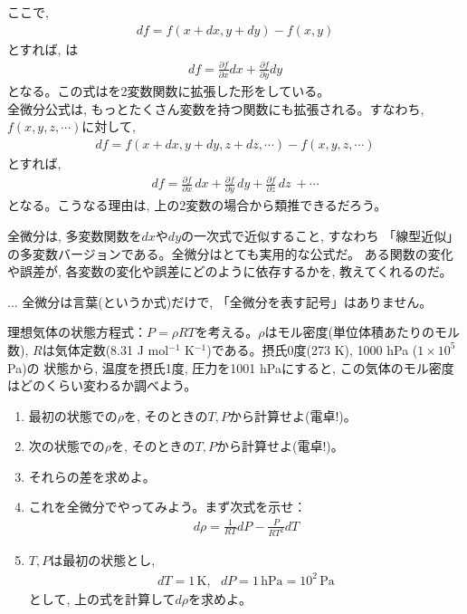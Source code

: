 ここで, 
\begin{eqnarray}df=f(x+dx,y+dy) - f(x, y)\end{eqnarray}
とすれば, は
\begin{eqnarray}
df= \frac{\partial f}{\partial x}dx+\frac{\partial f}{\partial y}dy
\end{eqnarray}
となる。この式はを2変数関数に拡張した形をしている。\\

全微分公式は, もっとたくさん変数を持つ関数にも拡張される。すなわち, $f(x, y, z, \cdots)$に対して, 
\begin{eqnarray*}df=f(x+dx, y+dy, z+dz, \cdots) - f(x, y, z, \cdots)\end{eqnarray*}
とすれば, 
\begin{eqnarray}
df = \frac{\partial f}{\partial x}\,dx + \frac{\partial f}{\partial y}\,dy + \frac{\partial f}{\partial z}\,dz\ + \cdots
\end{eqnarray}
となる。こうなる理由は, 上の2変数の場合から類推できるだろう。

全微分は, 多変数関数を$dx$や$dy$の一次式で近似すること, すなわち
「線型近似」の多変数バージョンである。全微分はとても実用的な公式だ。
ある関数の変化や誤差が, 各変数の変化や誤差にどのように依存するかを, 教えてくれるのだ。\\

\begin{faq}{\small{} ... 全微分は言葉(というか式)だけで, 
「全微分を表す記号」はありません。}\end{faq}\mv


\begin{q}\label{q:univ_deriv_gas} 理想気体の状態方程式：$P=\rho RT$を考える。$\rho$はモル密度(単位体積あたりのモル数), 
$R$は気体定数(8.31 J mol$^{-1}$ K$^{-1}$)である。摂氏0度(273 K), 1000 hPa ($1 \times 10^{5}$ Pa)の
状態から, 温度を摂氏1度, 圧力を1001 hPaにすると, この気体のモル密度はどのくらい変わるか調べよう。
\begin {enumerate}
\item 最初の状態での$\rho$を, そのときの$T, P$から計算せよ(電卓!)。
\item 次の状態での$\rho$を, そのときの$T, P$から計算せよ(電卓!)。
\item それらの差を求めよ。
\item これを全微分でやってみよう。まず次式を示せ：
\begin{eqnarray}d\rho=\frac{1}{RT}dP-\frac{P}{RT^2}dT\end{eqnarray}
\item $T, P$は最初の状態とし,
\begin{eqnarray}dT=1\,\text{K},\,\,\,\, dP=1\,\text{hPa}=10^2\,\text{Pa}\end{eqnarray}
として, 上の式を計算して$d\rho$を求めよ。
\end{enumerate}\end{q}

